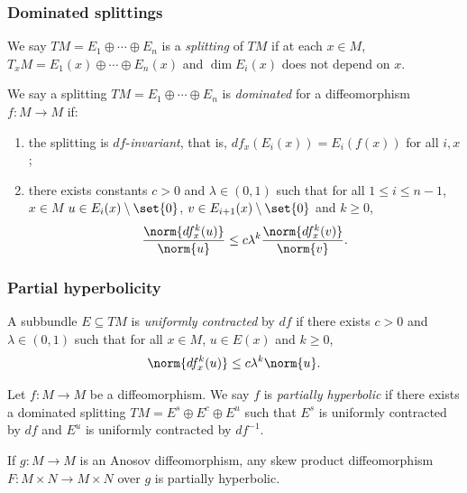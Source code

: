 \documentclass[shortlabels, 9pt, aspectratio=2013]{beamer}
\begin{document}
\begin{frame}
  \frametitle{Dominated splittings}
  \begin{definition}
    We say \(TM = E_1\oplus \cdots \oplus E_n\) is a \emph{splitting} of \(TM\) if at each \(x \in M\), \(T_xM = E_1(x)\oplus \cdots \oplus E_n(x)\) and \(\dim E_i(x)\) does not depend on \(x\).
  \end{definition}
  \begin{definition}
    We say a splitting \(TM = E_1\oplus \cdots \oplus E_n\) is \emph{dominated} for a diffeomorphism \(f \colon M \to M\) if:
    \begin{enumerate}
    \item the splitting is \(df\)-\emph{invariant}, that is, \(df_x(E_i(x)) = E_i(f(x))\) for all \(i,x\);
    \item there exists constants \(c > 0\) and \(\lambda \in (0,1)\) such that for all \(1 \le i \le n - 1\), \(x \in M\) \(u \in E_i(x) \setminus \set{0}\), \(v \in E_{i + 1}(x) \setminus \set{0}\) and \(k \ge 0\),
      \begin{equation*}
        \frac{\norm{df^k_x(u)}}{\norm{u}} \le c \lambda^k \frac{\norm{df^k_x(v)}}{\norm{v}}.
      \end{equation*}
    \end{enumerate}
  \end{definition}
\end{frame}

\begin{frame}
  \frametitle{Partial hyperbolicity}
  \begin{definition}
    A subbundle \(E \subseteq TM\) is \emph{uniformly contracted} by \(df\) if there exists \(c > 0\) and \(\lambda \in (0,1)\) such that for all \(x \in M\), \(u \in E(x)\) and \(k \ge 0\),
    \begin{equation*}
      \norm{df^k_x(u)} \le c \lambda^k \norm{u}.
    \end{equation*}
  \end{definition}

  \begin{definition}
    Let \(f \colon M \to M\) be a diffeomorphism. We say \(f\) is \emph{partially hyperbolic} if there exists a dominated splitting \(TM = E^s \oplus E^c \oplus E^u\) such that \(E^s\) is uniformly contracted by \(df\) and \(E^u\) is uniformly contracted by \(df ^{-1}\).
  \end{definition}
  \begin{example}
    If \(g \colon M \to M\) is an Anosov diffeomorphism, any skew product diffeomorphism \(F \colon M \times N \to M \times N\) over \(g\) is partially hyperbolic.
  \end{example}
\end{frame}
\end{document}
